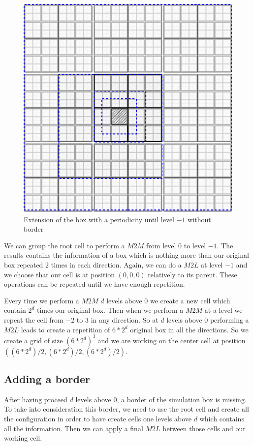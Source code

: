 \documentclass[12pt]{article} %
\begin{document}
\begin{figure}[h]
\centering
\includegraphics[scale=0.45]{../Images/PeriodicL-1}
\caption{Extension of the box with a periodicity until level $-1$ without border}
\end{figure}

We can group the root cell to perform a $M2M$ from level $0$ to level $-1$.
The results contains the information of a box which is nothing more than our original box repeated $2$ times in each direction.
Again, we can do a $M2L$ at level $-1$ and we choose that our cell is at position $(0,0,0)$ relatively to its parent.
These operations can be repeated until we have enough repetition.

Every time we perform a $M2M$ $d$ levels above $0$ we create a new cell which contain $2^d$ times our original box.
Then when we perform a $M2M$ at a level we repeat the cell from $-2$ to $3$ in any direction.
So at $d$ levels above $0$ performing a $M2L$ leads to create a repetition of $6*2^d$ original box in all the directions.
So we create a grid of size $(6*2^d)^3$ and we are working on the center cell at position $((6*2^d)/2,(6*2^d)/2,(6*2^d)/2)$.


\subsection{Adding a border}
After having proceed $d$ levels above $0$, a border of the simulation box is missing.
To take into consideration this border, we need to use the root cell and create all the configuration in order to have create
cells one levels above $d$ which contains all the information.
Then we can apply a final $M2L$ between those cells and our working cell.
\end{document}
